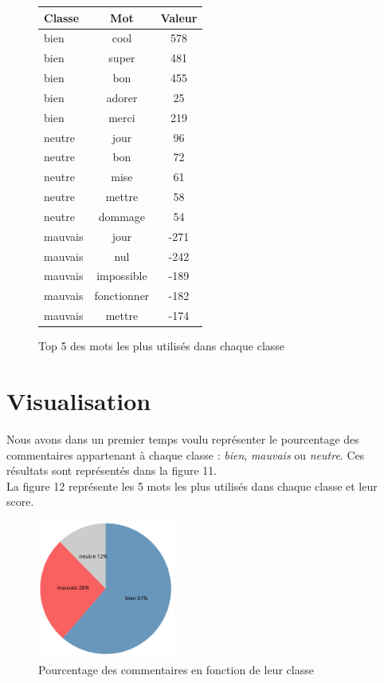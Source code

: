 \documentclass[a4paper, 11pt]{article}
\begin{document}
\begin{figure}[h]
\begin{center}


\begin{tabular}{|l|c|c|}
\hline
Classe &	Mot&	Valeur\\
\hline
\hline
bien&	cool&	578\\
\hline
bien&	super&	481\\
\hline
bien&	bon	&455\\
\hline
bien&	adorer&	25\\
\hline
bien&	merci&	219\\
\hline
\hline
neutre&	jour&	96\\
\hline
neutre&	bon	&72\\
\hline
neutre&	mise&	61\\
\hline
neutre&	mettre&	58\\
\hline
neutre&	dommage	&54\\
\hline
\hline
mauvais&	jour&	-271\\
\hline
mauvais	&nul	&-242\\
\hline
mauvais	&impossible	&-189\\
\hline
mauvais	&fonctionner&	-182\\
\hline
mauvais	&mettre&	-174\\
\hline
\end{tabular}
\end{center}
\caption{Top 5 des mots les plus utilisés dans chaque classe}
\end{figure}

\section{Visualisation}
Nous avons dans un premier temps voulu représenter le pourcentage des commentaires appartenant à chaque classe : \textit{bien}, \textit{mauvais} ou \textit{neutre}. Ces résultats sont représentés dans la figure 11.\\

La figure 12 représente les 5 mots les plus utilisés dans chaque classe et leur score.

\begin{figure}[h]
\begin{center}
\includegraphics[width=0.4\textwidth]{visu1.png}
\end{center}
\caption{Pourcentage des commentaires en fonction de leur classe}
\end{figure}
\end{document}
